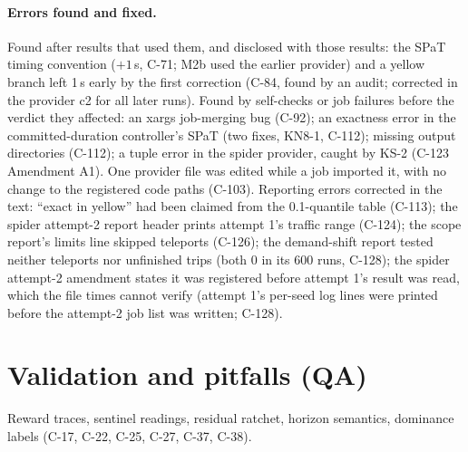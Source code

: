 \documentclass[11pt]{article}
\begin{document}
\paragraph{Errors found and fixed.} Found after results that used them, and disclosed with those results: the SPaT timing convention
($+1$\,s, C-71; M2b used the earlier provider) and a yellow branch left 1\,s early by the first correction (C-84, found by an audit;
corrected in the provider c2 for all later runs). Found by self-checks or job failures before the verdict they affected: an xargs job-merging bug (C-92); an exactness error in the committed-duration controller's SPaT (two fixes, KN8-1, C-112);
missing output directories (C-112); a tuple error in the spider provider, caught by KS-2 (C-123 Amendment A1). One provider file was edited
while a job imported it, with no change to the registered code paths (C-103).
Reporting errors corrected in the text: ``exact in yellow'' had been claimed from the 0.1-quantile table (C-113); the spider attempt-2
report header prints attempt 1's traffic range (C-124); the scope report's limits line skipped teleports (C-126); the demand-shift report tested neither teleports nor unfinished trips (both 0
in its 600 runs, C-128); the spider attempt-2 amendment states it was registered before attempt 1's result was read, which the file
times cannot verify (attempt 1's per-seed log lines were printed before the attempt-2 job list was written; C-128).
\section{Validation and pitfalls (QA)}
Reward traces, sentinel readings, residual ratchet, horizon semantics, dominance labels (C-17, C-22, C-25, C-27, C-37, C-38).
\end{document}
